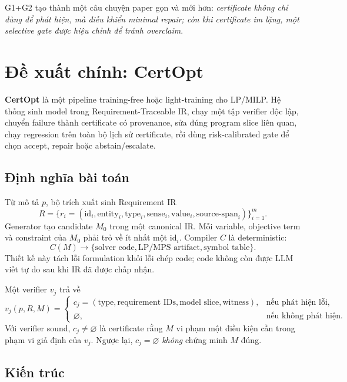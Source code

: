 \documentclass[11pt,a4paper]{article}
\newcommand{\method}{\textsf{\textbf{CertOpt}}\xspace}
\begin{document}
G1+G2 tạo thành một câu chuyện paper gọn và mới hơn: \emph{certificate không chỉ dùng để phát hiện, mà điều khiển minimal repair; còn khi certificate im lặng, một selective gate được hiệu chỉnh để tránh overclaim}.

\section{Đề xuất chính: \method}

\begin{proposalbox}
\method là một pipeline training-free hoặc light-training cho LP/MILP. Hệ thống sinh model trong Requirement-Traceable IR, chạy một tập verifier độc lập, chuyển failure thành certificate có provenance, sửa đúng program slice liên quan, chạy regression trên toàn bộ lịch sử certificate, rồi dùng risk-calibrated gate để chọn \textsf{accept}, \textsf{repair} hoặc \textsf{abstain/escalate}.
\end{proposalbox}

\subsection{Định nghĩa bài toán}

Từ mô tả \(p\), bộ trích xuất sinh Requirement IR
\[
R=\{r_i=(\text{id}_i,\text{entity}_i,\text{type}_i,\text{sense}_i,
\text{value}_i,\text{source-span}_i)\}_{i=1}^{m}.
\]
Generator tạo candidate \(M_0\) trong một canonical IR. Mỗi variable, objective term và constraint của \(M_0\) phải trỏ về ít nhất một \(\text{id}_i\). Compiler \(C\) là deterministic:
\[
C(M)\longrightarrow \{\text{solver code},\text{LP/MPS artifact},\text{symbol table}\}.
\]
Thiết kế này tách lỗi formulation khỏi lỗi chép code; code không còn được LLM viết tự do sau khi IR đã được chấp nhận.

Một verifier \(v_j\) trả về
\[
v_j(p,R,M)=
\begin{cases}
c_j=(\text{type},\text{requirement IDs},\text{model slice},\text{witness}), & \text{nếu phát hiện lỗi},\\
\varnothing, & \text{nếu không phát hiện}.
\end{cases}
\]
Với verifier sound, \(c_j\neq\varnothing\) là certificate rằng \(M\) vi phạm một điều kiện cần trong phạm vi giả định của \(v_j\). Ngược lại, \(c_j=\varnothing\) \emph{không} chứng minh \(M\) đúng.

\subsection{Kiến trúc}
\end{document}
